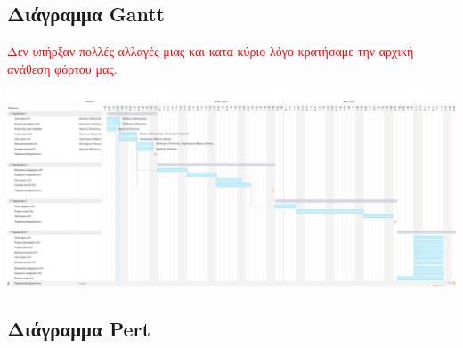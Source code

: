 \documentclass{article}
\begin{document}
\subsection{Διάγραμμα Gantt} 
 \textcolor{red}{Δεν υπήρξαν πολλές αλλαγές μιας και κατα κύριο λόγο κρατήσαμε την αρχική ανάθεση φόρτου μας.}
\begin{center}
    \includegraphics[scale=0.4]{gantteam.png}
\end{center}


\subsection{Διάγραμμα Pert} 
\end{document}
